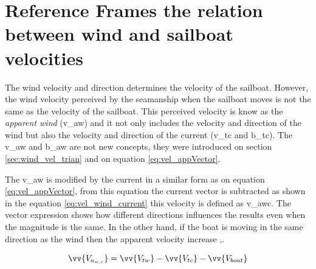 \section{Reference Frames the relation between wind and sailboat velocities}

The wind velocity and direction determines the velocity of the sailboat. However, the wind velocity perceived by the seamanship when the sailboat moves is not the same as the velocity of the sailboat. This perceived velocity is know as the \textit{apparent wind} (\acrshort{v_aw}) and it not only includes the velocity and direction of the wind but also the velocity and direction of the current (\acrshort{v_tc} and \acrshort{b_tc}). The \acrshort{v_aw} and \acrshort{b_aw} are not new concepts, they were introduced on section \ref{sec:wind_vel_trian} and on equation \ref{eq:vel_appVector}. \par

The \acrshort{v_aw} is modified by the current in a similar form as on equation \ref{eq:vel_appVector}, from this equation the current vector is subtracted as shown in the equation \ref{eq:vel_wind_current} this velocity is defined as \acrshort{v_awc}. The vector expression shows how different directions influences the results even when the magnitude is the same. In the other hand, if the boat is moving in the same direction as the wind then the apparent velocity increase \cite{denny2009float},\cite{allsopp1998stochastic}. \par 

\begin{equation} \label{eq:vel_wind_current}
\vv{V_{a_{w,c}}}= \vv{V_{tw}} -\vv{V_{tc}} - \vv{V_{boat}}
\end{equation}

